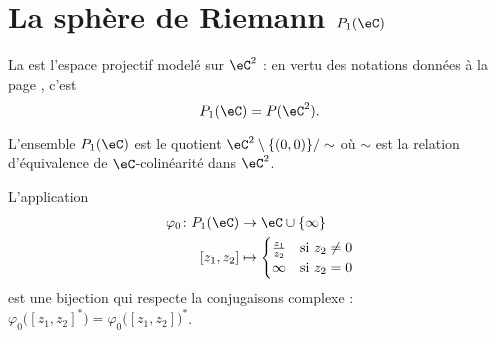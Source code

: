 
\section{La sphère de Riemann \( P_1(\eC)\)}

\begin{definition}      \label{DEFooSZGNooTzFYbh}
    La  est l'espace projectif modelé sur \( \eC^2\) : en vertu des notations données à la page \pageref{PgNotimesjNtMoW}, c'est
    \begin{equation}
        P_1(\eC)=P(\eC^2).
    \end{equation}
\end{definition}

L'ensemble \( P_1(\eC)\) est le quotient \( \eC^2\setminus\{ (0,0) \}/\sim\) où \( \sim\) est la relation d'équivalence de \( \eC\)-colinéarité dans \( \eC^2\).

\begin{lemma}       \label{LEMooKWZDooEIraSJ}
    L'application
    \begin{equation}        \label{EQooKJIZooZjhzuU}
        \begin{aligned}
            \varphi_0\colon P_1(\eC)&\to \eC\cup\{ \infty \} \\
            [z_1,z_2]&\mapsto \begin{cases}
                \frac{ z_1 }{ z_2 }    &   \text{si } z_2\neq 0\\
                \infty    &    \text{si } z_2=0
            \end{cases}
        \end{aligned}
    \end{equation}
    est une bijection qui respecte la conjugaisons complexe : \( \varphi_0\big( [z_1,z_2]^* \big)=\varphi_0\big( [z_1,z_2] \big)^*\).
\end{lemma}

